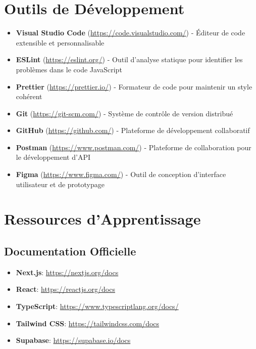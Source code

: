 \documentclass[12pt, a4paper]{report}
\begin{document}
\section{Outils de Développement}

\begin{itemize}
  \item \textbf{Visual Studio Code} (\url{https://code.visualstudio.com/}) - Éditeur de code extensible et personnalisable
  \item \textbf{ESLint} (\url{https://eslint.org/}) - Outil d'analyse statique pour identifier les problèmes dans le code JavaScript
  \item \textbf{Prettier} (\url{https://prettier.io/}) - Formateur de code pour maintenir un style cohérent
  \item \textbf{Git} (\url{https://git-scm.com/}) - Système de contrôle de version distribué
  \item \textbf{GitHub} (\url{https://github.com/}) - Plateforme de développement collaboratif
  \item \textbf{Postman} (\url{https://www.postman.com/}) - Plateforme de collaboration pour le développement d'API
  \item \textbf{Figma} (\url{https://www.figma.com/}) - Outil de conception d'interface utilisateur et de prototypage
\end{itemize}

\section{Ressources d'Apprentissage}

\subsection{Documentation Officielle}
\begin{itemize}
  \item \textbf{Next.js}: \url{https://nextjs.org/docs}
  \item \textbf{React}: \url{https://reactjs.org/docs}
  \item \textbf{TypeScript}: \url{https://www.typescriptlang.org/docs/}
  \item \textbf{Tailwind CSS}: \url{https://tailwindcss.com/docs}
  \item \textbf{Supabase}: \url{https://supabase.io/docs}
\end{itemize}
\end{document}
